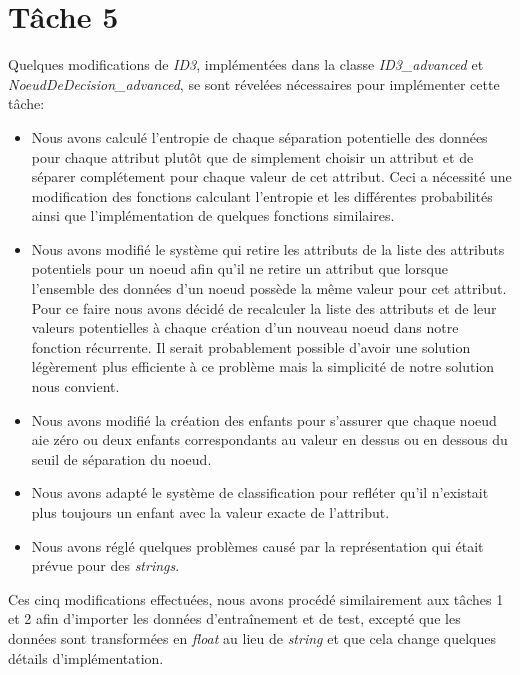 \documentclass[a4paper,11pt,french]{article}
\begin{document}
\section{Tâche 5}
Quelques modifications de \emph{ID3}, implémentées dans la classe \emph{ID3\_advanced} et \emph{NoeudDeDecision\_advanced}, se sont révelées nécessaires pour implémenter cette tâche:
\begin{itemize}
\item Nous avons calculé l'entropie de chaque séparation potentielle des données pour chaque attribut plutôt que de simplement choisir un attribut et de séparer complétement pour chaque valeur de cet attribut. Ceci a nécessité une modification des fonctions calculant l'entropie et les différentes probabilités ainsi que l'implémentation de quelques fonctions similaires.
\item Nous avons modifié le système qui retire les attributs de la liste des attributs potentiels pour un noeud afin qu'il ne retire un attribut que lorsque l'ensemble des données d'un noeud possède la même valeur pour cet attribut. Pour ce faire nous avons décidé de recalculer la liste des attributs et de leur valeurs potentielles à chaque création d'un nouveau noeud dans notre fonction récurrente. Il serait probablement possible d'avoir une solution légèrement plus efficiente à ce problème mais la simplicité de notre solution nous convient.
\item Nous avons modifié la création des enfants pour s'assurer que chaque noeud aie zéro ou deux enfants correspondants au valeur en dessus ou en dessous du seuil de séparation du noeud.
\item Nous avons adapté le système de classification pour refléter qu'il n'existait plus toujours un enfant avec la valeur exacte de l'attribut.
\item Nous avons réglé quelques problèmes causé par la représentation qui était prévue pour des \emph{strings}.
\end{itemize}
Ces cinq modifications effectuées, nous avons procédé similairement aux tâches 1 et 2 afin d'importer les données d'entraînement et de test, excepté que les données sont transformées en \emph{float} au lieu de \emph{string} et que cela change quelques détails d'implémentation.
\end{document}
